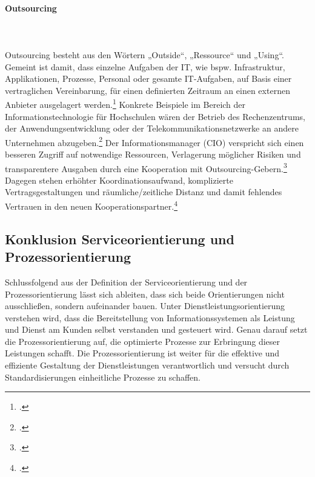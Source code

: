 \paragraph{Outsourcing}\mbox{}\\\\
Outsourcing besteht aus den Wörtern „Outside“, „Ressource“ und „Using“. Gemeint ist damit, dass einzelne Aufgaben der IT, wie bspw. Infrastruktur, Applikationen, Prozesse, Personal oder gesamte IT-Aufgaben, auf Basis einer vertraglichen Vereinbarung, für einen definierten Zeitraum an einen externen Anbieter ausgelagert werden.\footcite{Zitat fehlt} Konkrete Beispiele im Bereich der Informationstechnologie für Hochschulen wären der Betrieb des Rechenzentrums, der Anwendungsentwicklung oder der Telekommunikationsnetzwerke an andere Unternehmen abzugeben.\footcite{Zitat fehlt} Der Informationsmanager (CIO) verspricht sich einen besseren Zugriff auf notwendige Ressourcen, Verlagerung möglicher Risiken und transparentere Ausgaben durch eine Kooperation mit Outsourcing-Gebern.\footcite{Zitat fehlt} Dagegen stehen erhöhter Koordinationsaufwand, komplizierte Vertragsgestaltungen und räumliche/zeitliche Distanz und damit fehlendes Vertrauen in den neuen Kooperationspartner.\footcite{Zitat fehlt}

\subsection{Konklusion Serviceorientierung und Prozessorientierung}
Schlussfolgend aus der Definition der Serviceorientierung und der Prozessorientierung lässt sich ableiten, dass sich beide Orientierungen nicht ausschließen, sondern aufeinander bauen. Unter Dienstleistungsorientierung verstehen wird, dass die Bereitstellung von Informationssystemen als Leistung und Dienst am Kunden selbst verstanden und gesteuert wird. Genau darauf setzt die Prozessorientierung auf, die optimierte Prozesse zur Erbringung dieser Leistungen schafft. Die Prozessorientierung ist weiter für die effektive und effiziente Gestaltung der Dienstleistungen verantwortlich und versucht durch Standardisierungen einheitliche Prozesse zu schaffen. 
